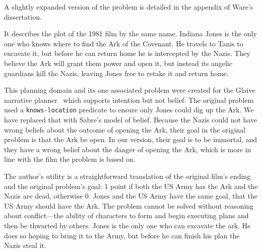 \documentclass{nilreport}
\makeatletter
\renewcommand{\bibentry}[1]{\nocite{#1}{\frenchspacing\@nameuse{BR@r@#1\@extra@b@citeb}}}
\makeatother
\begin{document}
\noindent A slightly expanded version of the problem is detailed in
the appendix of Ware's dissertation.

\begin{quote}
	\bibentry{ware2014thesis}
\end{quote}

\noindent It describes the plot of the 1981 film by the same name.
Indiana Jones is the only one who knows where to find the Ark of the
Covenant. He travels to Tanis to excavate it, but before he can return
home he is intercepted by the Nazis. They believe the Ark will grant
them power and open it, but instead its angelic guardians kill the
Nazis, leaving Jones free to retake it and return home.

This planning domain and its one associated problem were created for
the Glaive narrative planner~\cite{ware2014glaive} which supports
intention but not belief. The original problem used a \texttt{knows-location}
predicate to ensure only Jones could dig up the Ark. We have replaced
that with Sabre's model of belief. Because the Nazis could not have
wrong beliefs about the outcome of opening the Ark, their goal in
the original problem is that the Ark be open. In our version, their
goal is to be immortal, and they have a wrong belief about the danger
of opening the Ark, which is more in line with the film the problem
is based on.

The author's utility is a straightforward translation of the original
film's ending and the original problem's goal: 1 point if both the
US Army has the Ark and the Nazis are dead, otherwise 0. Jones and
the US Army have the same goal, that the US Army should have the Ark.
The problem cannot be solved without reasoning about conflict---the
ability of characters to form and begin executing plans and then be
thwarted by others. Jones is the only one who can excavate the ark.
He does so hoping to bring it to the Army, but before he can finish
his plan the Nazis steal it.

\medskip{}
\noindent{}
\end{document}
